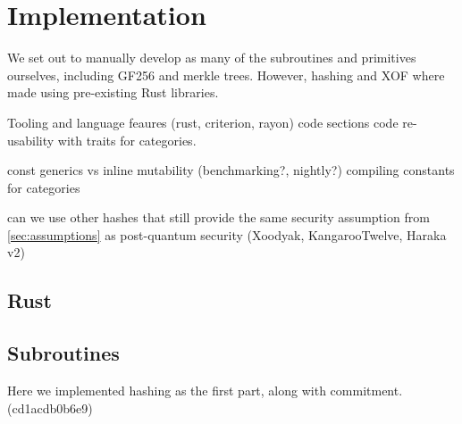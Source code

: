 \documentclass[twoside,11pt]{report}
\theoremstyle{definition}
\theoremstyle{plain}
\begin{document}

\chapter{Implementation}\label{ch:impl}

We set out to manually develop as many of the subroutines and primitives ourselves, including GF256 and merkle trees. However, hashing and XOF where made using pre-existing Rust libraries.

Tooling and language feaures (rust, criterion, rayon)
code sections
code re-usability with traits for categories.

const generics vs inline mutability (benchmarking?, nightly?)
compiling constants for categories

can we use other hashes that still provide the same security assumption from \autoref{sec:assumptions} as post-quantum security (Xoodyak, KangarooTwelve, Haraka v2)


\section{Rust}
\cite{nistsaferlanguages}

\section{Subroutines}\label{sub:subroutines}
Here we implemented hashing as the first part, along with commitment. (cd1acdb0b6e9)
\end{document}
